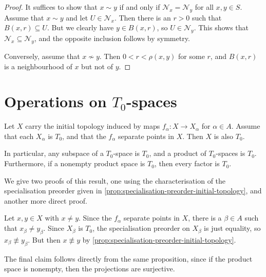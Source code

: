 \documentclass[article, a4paper, 11pt, oneside]{memoir}
\numberwithin{equation}{chapter}
\newcommand{\calN}{\mathcal{N}}
\newcommand{\nhoodfilter}[1]{\calN_{#1}}
\begin{document}
\begin{proof}
    It suffices to show that $x \sim y$ if and only if $\nhoodfilter{x} = \nhoodfilter{y}$ for all $x,y \in S$. Assume that $x \sim y$ and let $U \in \nhoodfilter{x}$. Then there is an $r > 0$ such that $B(x,r) \subseteq U$. But we clearly have $y \in B(x,r)$, so $U \in \nhoodfilter{y}$. This shows that $\nhoodfilter{x} \subseteq \nhoodfilter{y}$, and the opposite inclusion follows by symmetry.

    Conversely, assume that $x \not\sim y$. Then $0 < r < \rho(x,y)$ for some $r$, and $B(x,r)$ is a neighbourhood of $x$ but not of $y$.
\end{proof}


\section[Operations on T0-spaces][Operations on $T_0$-spaces]{Operations on $T_0$-spaces}


\begin{proposition}
    \label{thm:T0-initial-topology}
    Let $X$ carry the initial topology induced by maps $f_\alpha \colon X \to X_\alpha$ for $\alpha \in A$. Assume that each $X_\alpha$ is $T_0$, and that the $f_\alpha$ separate points in $X$. Then $X$ is also $T_0$.

    In particular, any subspace of a $T_0$-space is $T_0$, and a product of $T_0$-spaces is $T_0$. Furthermore, if a nonempty product space is $T_0$, then every factor is $T_0$. %
\end{proposition}
%
We give two proofs of this result, one using the characterisation of the specialisation preorder given in \cref{prop:specialisation-preorder-initial-topology}, and another more direct proof.

\begin{proofof}[Proof 1]
    Let $x,y \in X$ with $x \neq y$. Since the $f_\alpha$ separate points in $X$, there is a $\beta \in A$ such that $x_\beta \neq y_\beta$. Since $X_\beta$ is $T_0$, the specialisation preorder on $X_\beta$ is just equality, so $x_\beta \not\equiv y_\beta$. But then $x \not\equiv y$ by \cref{prop:specialisation-preorder-initial-topology}.

    The final claim follows directly from the same proposition, since if the product space is nonempty, then the projections are surjective.
\end{proofof}
\end{document}
